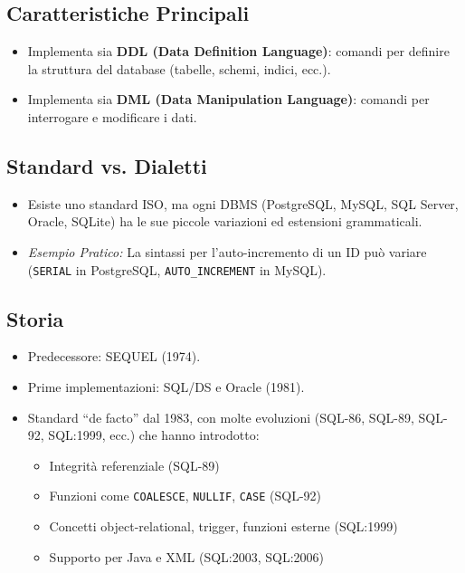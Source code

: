 	\subsection{Caratteristiche Principali}
	\begin{itemize}
		\item Implementa sia \textbf{DDL (Data Definition Language)}: comandi per definire la struttura del database (tabelle, schemi, indici, ecc.).
		\item Implementa sia \textbf{DML (Data Manipulation Language)}: comandi per interrogare e modificare i dati.
	\end{itemize}
	
	\subsection{Standard vs. Dialetti}
	\begin{itemize}
		\item Esiste uno standard ISO, ma ogni DBMS (PostgreSQL, MySQL, SQL Server, Oracle, SQLite) ha le sue piccole variazioni ed estensioni grammaticali.
		\item \textit{Esempio Pratico:} La sintassi per l'auto-incremento di un ID può variare (\texttt{SERIAL} in PostgreSQL, \texttt{AUTO\_INCREMENT} in MySQL).
	\end{itemize}
	
	\subsection{Storia}
	\begin{itemize}
		\item Predecessore: SEQUEL (1974).
		\item Prime implementazioni: SQL/DS e Oracle (1981).
		\item Standard ``de facto'' dal 1983, con molte evoluzioni (SQL-86, SQL-89, SQL-92, SQL:1999, ecc.) che hanno introdotto:
		\begin{itemize}
			\item Integrità referenziale (SQL-89)
			\item Funzioni come \texttt{COALESCE}, \texttt{NULLIF}, \texttt{CASE} (SQL-92)
			\item Concetti object-relational, trigger, funzioni esterne (SQL:1999)
			\item Supporto per Java e XML (SQL:2003, SQL:2006)
		\end{itemize}
	\end{itemize}
	
